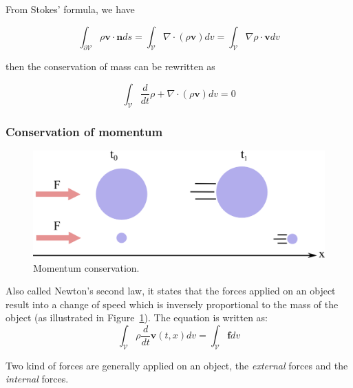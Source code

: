 From Stokes' formula, we have

\begin{equation}
\displaystyle 
\int_{\partial \mathcal{V}} \rho \mathbf{v} \cdot \mathbf{n} ds =
\int_{\mathcal{V}} \nabla \cdot \left( \rho \mathbf{v} \right) dv =
\int_{\mathcal{V}} \nabla \rho \cdot \mathbf{v} dv
\end{equation}

then the conservation of mass can be rewritten as

\begin{equation}
\label{eq:volumetricMassConservation}
\displaystyle \int_{\mathcal{V}} \frac{d}{dt} \rho + \nabla \cdot \left( \rho  \mathbf{v} \right) dv = 0
\end{equation}

\subsubsection{Conservation of momentum}

\begin{figure}[!ht]
\centering
\includegraphics[scale=1.5]{images/continuum_mechanics/momentumConservation.png}
\caption[STAR mechanics: Momentum conservation]{\label{fig:momentumConservation} Momentum conservation.}
\end{figure}

Also called Newton's second law, it states that the forces applied on an object result into a change of speed which is inversely proportional to the mass of the object (as illustrated in Figure~\ref{fig:momentumConservation}). The equation is written as:
\begin{equation}
\label{eq:momentumConservation}
\displaystyle \int_{\mathcal{V}} \rho \frac{d}{dt} \mathbf{v}(t,x) dv = \int_{\mathcal{V}} \mathbf{f} dv
\end{equation}

Two kind of forces are generally applied on an object, the \emph{external} forces and the \emph{internal} forces.

